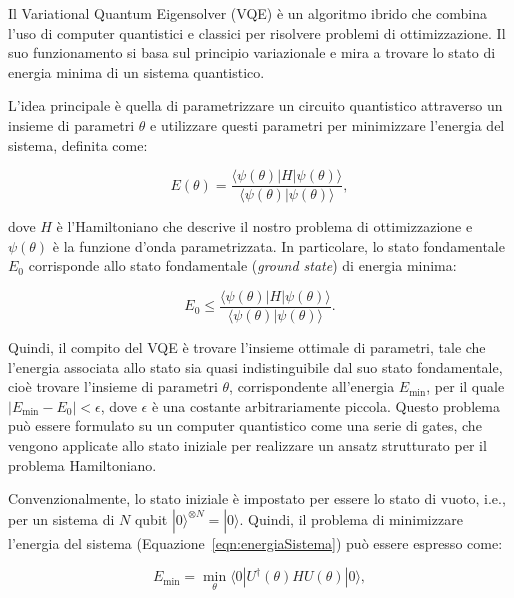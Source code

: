 Il Variational Quantum Eigensolver (VQE) è un algoritmo ibrido che combina l'uso di 
computer quantistici e classici per risolvere problemi di ottimizzazione. Il suo 
funzionamento si basa sul principio variazionale e mira a trovare lo stato di energia 
minima di un sistema quantistico.

L'idea principale è quella di parametrizzare un circuito quantistico attraverso un 
insieme di parametri $\theta$ e utilizzare questi parametri per minimizzare l'energia 
del sistema, definita come:

\begin{equation}\label{eqn:energiaSistema}
    E(\theta) = \frac{
                    \langle\psi(\theta)|H|\psi(\theta)\rangle
                }
                {
                    \langle\psi(\theta)|\psi(\theta)\rangle
                },
\end{equation}

dove $H$ è l'Hamiltoniano che descrive il nostro problema di ottimizzazione e 
$\psi(\theta)$ è la funzione d'onda parametrizzata. In particolare, lo stato 
fondamentale $E_0$ corrisponde allo stato fondamentale (\textit{ground state}) 
di energia minima: 

\begin{equation}
    E_0 \le \frac{
                    \langle\psi(\theta)|H|\psi(\theta)\rangle
                }
                {
                    \langle\psi(\theta)|\psi(\theta)\rangle
                }.
\end{equation}

Quindi, il compito del VQE è trovare l'insieme ottimale di parametri, tale che 
l'energia associata allo stato sia quasi indistinguibile dal suo stato fondamentale, 
cioè trovare l'insieme di parametri $\theta$, corrispondente all'energia $E_{\min}$, 
per il quale $|E_{\min} - E_0| < \epsilon$, dove $\epsilon$ è una costante 
arbitrariamente piccola. Questo problema può essere formulato su un computer 
quantistico come una serie di gates, che vengono applicate allo stato iniziale 
per realizzare un ansatz strutturato per il problema Hamiltoniano. 

Convenzionalmente, lo stato iniziale è impostato per essere lo stato di vuoto, i.e., 
per un sistema di $N$ qubit $|0\rangle^{\otimes N} = |0\rangle$. 
Quindi, il problema di minimizzare l'energia del sistema (Equazione~\ref{eqn:energiaSistema}) 
può essere espresso come:

\begin{equation}
    E_{\min} = \min_{\theta} \langle 0|U^{\dagger}(\theta)HU(\theta)|0\rangle,
\end{equation}

